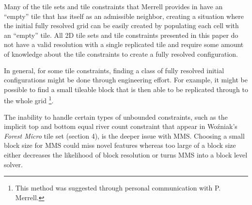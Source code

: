 Many of the tile sets and tile constraints that Merrell provides in \cite{Merrell_2007, Merrell_2009} have an ``empty'' tile that 
has itself as an admissible neighbor, creating a situation where the initial fully resolved grid can be easily created
by populating each cell with an ``empty'' tile.
All 2D tile sets and tile constraints presented in this paper do not have a valid resolution with a single replicated
tile and require some amount of knowledge about the tile constraints
to create a fully resolved configuration.

In general, for some tile constraints, finding a class of fully resolved initial configurations might be done through engineering effort.
For example, it might be possible to find a small tileable block that is then able to be replicated through to the whole grid
\footnote{ This method was suggested through personal communication with P. Merrell. }.

The inability to handle certain types of unbounded constraints, such as the implicit top and bottom equal river count constraint that appear in
Wo\'zniak's \textit{Forest Micro} tile set (section 4), is the deeper issue with MMS.
Choosing a small block size for MMS could miss novel features whereas too large of a block size either decreases
the likelihood of block resolution or turns MMS into a block level solver.





